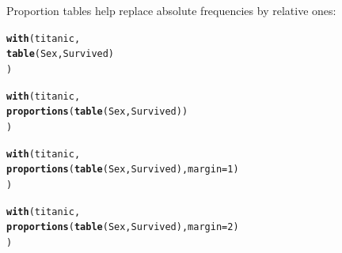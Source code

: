 \documentclass[12pt]{article}\usepackage[]{graphicx}\usepackage[]{xcolor}
\makeatletter
\newcommand{\hlnum}[1]{\textcolor[rgb]{0.686,0.059,0.569}{#1}}%
\newcommand{\hldef}[1]{\textcolor[rgb]{0.345,0.345,0.345}{#1}}%
\newcommand{\hlkwc}[1]{\textcolor[rgb]{0.333,0.667,0.333}{#1}}%
\newcommand{\hlkwd}[1]{\textcolor[rgb]{0.737,0.353,0.396}{\textbf{#1}}}%
\newenvironment{kframe}{%
 \def\at@end@of@kframe{}%
 \ifinner\ifhmode%
  \def\at@end@of@kframe{\end{minipage}}%
  \begin{minipage}{\columnwidth}%
 \fi\fi%
 \def\FrameCommand##1{\hskip\@totalleftmargin \hskip-\fboxsep
 \colorbox{shadecolor}{##1}\hskip-\fboxsep
     \hskip-\linewidth \hskip-\@totalleftmargin \hskip\columnwidth}%
 \MakeFramed {\advance\hsize-\width
   \@totalleftmargin\z@ \linewidth\hsize
   \@setminipage}}%
 {\par\unskip\endMakeFramed%
 \at@end@of@kframe}
\newenvironment{knitrout}{}{} %
\makeatother
\begin{document}
Proportion tables help replace absolute frequencies by relative ones:
\begin{knitrout}
\color{fgcolor}\begin{kframe}
\begin{alltt}
\hlkwd{with}\hldef{(titanic,}
     \hlkwd{table}\hldef{(Sex,Survived)}
     \hldef{)}
\end{alltt}


{\ttfamily\noindent\bfseries\color{errorcolor}{\#\# Error:\\\#\# ! object 'titanic' not found}}\begin{alltt}
\hlkwd{with}\hldef{(titanic,}
     \hlkwd{proportions}\hldef{(}\hlkwd{table}\hldef{(Sex,Survived))}
     \hldef{)}
\end{alltt}


{\ttfamily\noindent\bfseries\color{errorcolor}{\#\# Error:\\\#\# ! object 'titanic' not found}}\begin{alltt}
\hlkwd{with}\hldef{(titanic,}
     \hlkwd{proportions}\hldef{(}\hlkwd{table}\hldef{(Sex,Survived),}\hlkwc{margin}\hldef{=}\hlnum{1}\hldef{)}
     \hldef{)}
\end{alltt}


{\ttfamily\noindent\bfseries\color{errorcolor}{\#\# Error:\\\#\# ! object 'titanic' not found}}\begin{alltt}
\hlkwd{with}\hldef{(titanic,}
     \hlkwd{proportions}\hldef{(}\hlkwd{table}\hldef{(Sex,Survived),}\hlkwc{margin}\hldef{=}\hlnum{2}\hldef{)}
     \hldef{)}
\end{alltt}


{\ttfamily\noindent\bfseries\color{errorcolor}{\#\# Error:\\\#\# ! object 'titanic' not found}}\end{kframe}
\end{knitrout}
\end{document}

